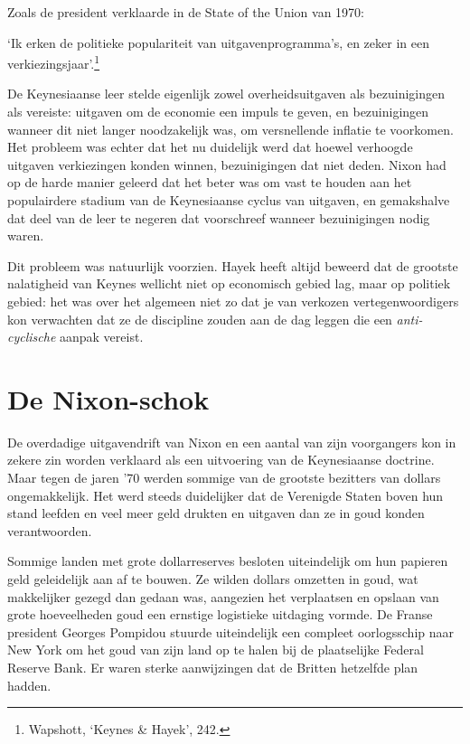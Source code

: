 \documentclass[smalldemyvopaper,11pt,twoside,onecolumn,openright,extrafontsizes,hidelinks]{memoir}
\begin{document}
Zoals de president verklaarde in de State of the Union van 1970:

`Ik erken de politieke populariteit van uitgavenprogramma's, en zeker in
een verkiezingsjaar'.\footnote{\hspace{0pt}Wapshott, `Keynes \& Hayek',
  242.}

De Keynesiaanse leer stelde eigenlijk zowel overheidsuitgaven als
bezuinigingen als vereiste: uitgaven om de economie een impuls te geven,
en bezuinigingen wanneer dit niet langer noodzakelijk was, om
versnellende inflatie te voorkomen. Het probleem was echter dat het nu
duidelijk werd dat hoewel verhoogde uitgaven verkiezingen konden winnen,
bezuinigingen dat niet deden. Nixon had op de harde manier geleerd dat
het beter was om vast te houden aan het populairdere stadium van de
Keynesiaanse cyclus van uitgaven, en gemakshalve dat deel van de leer te
negeren dat voorschreef wanneer bezuinigingen nodig waren.

Dit probleem was natuurlijk voorzien. Hayek heeft altijd beweerd dat de
grootste nalatigheid van Keynes wellicht niet op economisch gebied lag,
maar op politiek gebied: het was over het algemeen niet zo dat je van
verkozen vertegenwoordigers kon verwachten dat ze de discipline zouden
aan de dag leggen die een \emph{anti-cyclische} aanpak vereist.

\section{De Nixon-schok}\label{de-nixon-schok}

De overdadige uitgavendrift van Nixon en een aantal van zijn voorgangers
kon in zekere zin worden verklaard als een uitvoering van de
Keynesiaanse doctrine. Maar tegen de jaren '70 werden sommige van de
grootste bezitters van dollars ongemakkelijk. Het werd steeds
duidelijker dat de Verenigde Staten boven hun stand leefden en veel meer
geld drukten en uitgaven dan ze in goud konden verantwoorden.

Sommige landen met grote dollarreserves besloten uiteindelijk om hun
papieren geld geleidelijk aan af te bouwen. Ze wilden dollars omzetten
in goud, wat makkelijker gezegd dan gedaan was, aangezien het
verplaatsen en opslaan van grote hoeveelheden goud een ernstige
logistieke uitdaging vormde. De Franse president Georges Pompidou
stuurde uiteindelijk een compleet oorlogsschip naar New York om het goud
van zijn land op te halen bij de plaatselijke Federal Reserve Bank. Er
waren sterke aanwijzingen dat de Britten hetzelfde plan hadden.
\end{document}
